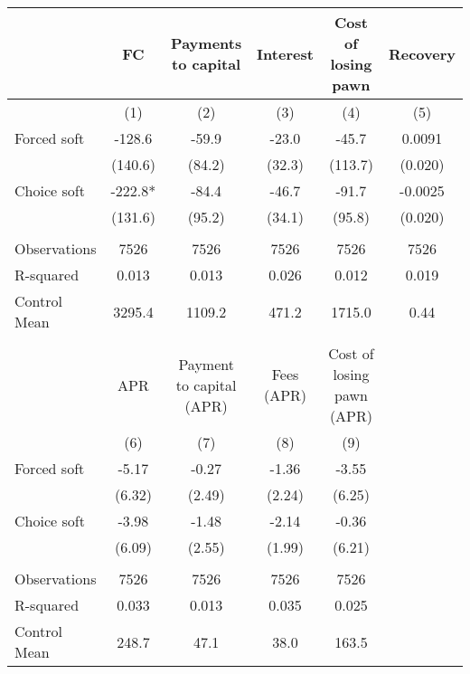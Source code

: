 \begin{tabular}{lccccc}
\toprule
      & FC    & Payments to capital & Interest & Cost of losing pawn & Recovery \\
\midrule
      & (1)   & (2)   & (3)   & (4)   & (5) \\
\midrule
\midrule
Forced soft & -128.6 & -59.9 & -23.0 & -45.7 & 0.0091 \\
      & (140.6) & (84.2) & (32.3) & (113.7) & (0.020) \\
Choice soft & -222.8* & -84.4 & -46.7 & -91.7 & -0.0025 \\
      & (131.6) & (95.2) & (34.1) & (95.8) & (0.020) \\
      &       &       &       &       &  \\
\midrule
Observations & 7526  & 7526  & 7526  & 7526  & 7526 \\
R-squared & 0.013 & 0.013 & 0.026 & 0.012 & 0.019 \\
Control Mean & 3295.4 & 1109.2 & 471.2 & 1715.0 & 0.44 \\
\midrule
\midrule
      &       &       &       &       &  \\
\cmidrule{1-5}      & APR   & Payment to capital (APR) & Fees (APR) & Cost of losing pawn (APR) &  \\
\cmidrule{1-5}      & (6)   & (7)   & (8)   & (9)   &  \\
\cmidrule{1-5}Forced soft & -5.17 & -0.27 & -1.36 & -3.55 &  \\
      & (6.32) & (2.49) & (2.24) & (6.25) &  \\
Choice soft & -3.98 & -1.48 & -2.14 & -0.36 &  \\
      & (6.09) & (2.55) & (1.99) & (6.21) &  \\
      &       &       &       &       &  \\
\cmidrule{1-5}Observations & 7526  & 7526  & 7526  & 7526  &  \\
R-squared & 0.033 & 0.013 & 0.035 & 0.025 &  \\
Control Mean & 248.7 & 47.1  & 38.0  & 163.5 &  \\
\cmidrule{1-5}\end{tabular}%
